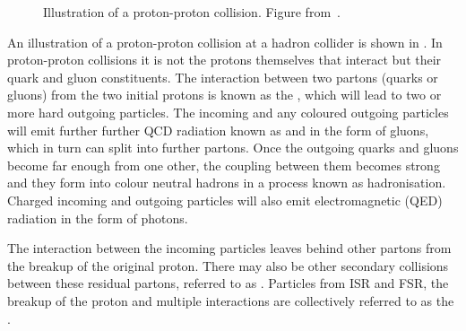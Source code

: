 \begin{figure}
\centering
        \vspace{-5mm}
    \caption[Illustration of a proton-proton collision.] {\small
Illustration of a proton-proton collision. Figure from~\cite{Campbell:2006wx}.
}
    \label{fig:pp-event}
\end{figure}

An illustration of a proton-proton collision at a hadron collider is shown in
. In proton-proton collisions it is not the
protons themselves that interact but their quark and gluon constituents. The interaction between two  partons (quarks or gluons) from the two initial
protons is known as the , which will lead to two or more
hard outgoing particles. The incoming and any coloured outgoing particles will
emit further further QCD radiation known as  
and  in the form of gluons, which in turn can
split into further partons. Once the outgoing quarks and gluons become far enough from
one other, the coupling between them becomes strong and they form into colour neutral
hadrons in a process known as hadronisation. Charged incoming and outgoing
particles will also emit electromagnetic (QED) radiation in the form of photons. 

The interaction between the incoming
particles leaves behind other partons from the breakup of the original proton.
There may also be other secondary collisions between these residual partons,
referred to as . Particles from ISR and FSR, the breakup of the proton and
multiple interactions are collectively referred to as the .

